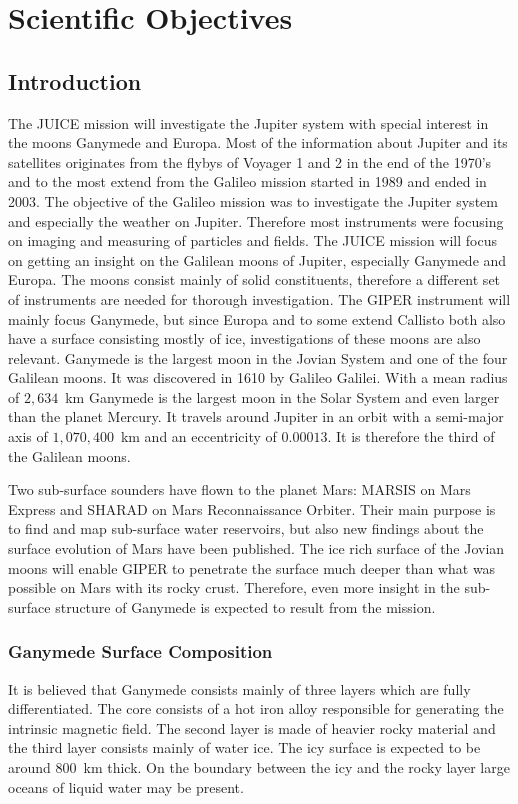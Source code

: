 \section{Scientific Objectives}
%
%
\subsection{Introduction\label{sub:Introduction-science}}
%
The JUICE mission will investigate
the Jupiter system with special interest in the moons Ganymede and
Europa. Most of the information about Jupiter and its satellites
originates from the flybys of Voyager 1 and 2 in the end of the 1970's and to the most extend from the Galileo mission started in 1989 and ended in 2003. The objective of the Galileo mission was to investigate the Jupiter system and especially the weather on Jupiter. Therefore most instruments were focusing on imaging and measuring of particles and fields. The JUICE mission will focus on getting an insight on the Galilean moons of Jupiter, especially Ganymede and Europa. The moons consist mainly of solid constituents, therefore a different set of instruments are needed for thorough investigation. The \ac{GIPER} instrument will mainly focus Ganymede, but since Europa and to some extend Callisto both also have a surface consisting mostly of ice,
investigations of these moons are also relevant\cite{pater2010planetary}.
Ganymede is the largest moon in the Jovian System and one of the four
Galilean moons. It was discovered in 1610 by Galileo Galilei. With
a mean radius of $2,634$~km Ganymede is the largest moon in the Solar
System and even larger than the planet Mercury. It travels around
Jupiter in an orbit with a semi-major axis of $1,070,400$~km and an
eccentricity of $0.00013$. It is therefore the third of the Galilean
moons\cite{pater2010planetary}. 

Two sub-surface sounders have flown to the planet Mars: \ac{MARSIS} on Mars Express and \ac{SHARAD} on Mars Reconnaissance Orbiter. Their main purpose is to find and map sub-surface
water reservoirs\cite{Mouginot2010}, but also new findings about
the surface evolution of Mars have been published\cite{Watters2006}.
The ice rich surface of the Jovian moons will enable \ac{GIPER} to penetrate
the surface much deeper than what was possible on Mars with its rocky
crust. Therefore, even more insight in the sub-surface structure of
Ganymede is expected to result from the mission. 
%
%
\subsubsection{Ganymede Surface Composition }
%
It is believed that Ganymede consists mainly of three layers which are
fully differentiated. The core consists of a hot iron alloy responsible for generating the intrinsic magnetic field. The second
layer is made of heavier rocky material and the third layer consists
mainly of water ice. The icy surface is expected to be around $800$~km
thick. On the boundary between the icy and the rocky layer large oceans
of liquid water may be present\cite{bagenal2007jupiter}.

